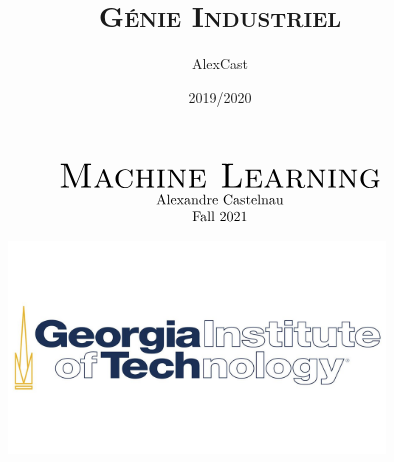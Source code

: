 \documentclass[11pt]{article}
\title{\LARGE\textsc{{Génie Industriel}}}
\author{AlexCast}
\date{2019/2020}
\begin{document}
\begin{titlepage}
\begin{center}
$$   \begin{array}{cc}
        \mbox{\Huge\textsc{{Machine Learning}}}\\
        \mbox{Alexandre Castelnau}\\
        \mbox{Fall 2021}
    \end{array}$$
\end{center}
\begin{figure}[b]
    \centering
    \includegraphics[width=10cm]{GT-logo.jpg}
\end{figure}
\end{titlepage}
\newpage

\tableofcontents
\newpage
\end{document}
